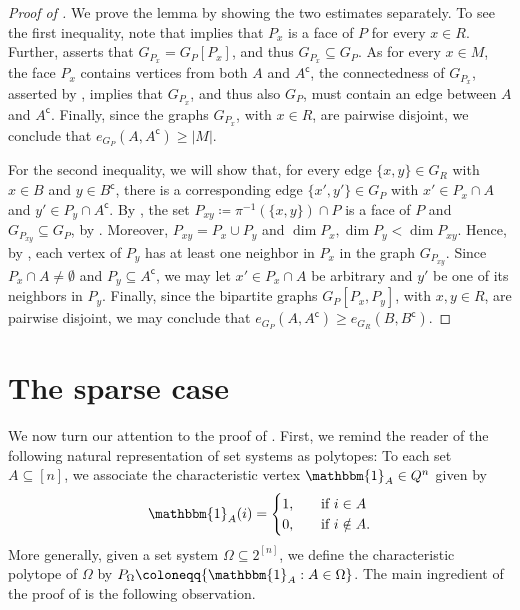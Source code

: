 \documentclass[11pt,a4paper,oneside,reqno]{amsart}
\def\1{\mathbbm{1}}
\begin{document}
\begin{proof}[Proof of ]
  We prove the lemma by showing the two estimates separately.
  To see the first inequality, note that  implies that $P_x$ is a face of $P$ for every $x\in R$.
  Further,  asserts that $G_{P_x} = G_P[P_x]$, and thus $G_{P_x} \subseteq G_P$.
  As for every $x\in M$, the face $P_x$ contains vertices from both $A$ and $A^{\mathsf{c}}$, the connectedness of $G_{P_x}$, asserted by , implies that $G_{P_x}$, and thus also $G_P$, must contain an edge between $A$ and $A^{\mathsf{c}}$.
  Finally, since the graphs $G_{P_x}$, with $x \in R$, are pairwise disjoint, we conclude that $e_{G_P}(A,A^{\mathsf{c}}) \geq |M|$.

  For the second inequality, we will show that, for every edge $\{x,y\} \in G_R$ with $x\in B$ and $y\in B^{\mathsf{c}}$, there is a corresponding edge $\{x', y'\} \in G_P$ with $x' \in P_x \cap A$ and $y' \in P_y \cap A^{\mathsf{c}}$.
  By , the set $P_{xy} \coloneqq \pi^{-1}(\{x,y\}) \cap P$ is a face of $P$ and $G_{P_{xy}} \subseteq G_P$, by .
  Moreover, $P_{xy} = P_x \cup P_y$ and $\dim{P_x}, \dim{P_y} < \dim{P_{xy}}$.
  Hence, by , each vertex of $P_y$ has at least one neighbor in $P_x$ in the graph $G_{P_{xy}}$.
  Since $P_x \cap A \neq \emptyset$ and $P_y \subseteq A^{\mathsf{c}}$, we may let $x' \in P_x \cap A$ be arbitrary and $y'$ be one of its neighbors in $P_y$.
  Finally, since the bipartite graphs $G_P[P_x, P_y]$, with $x, y \in R$, are pairwise disjoint, we may conclude that $e_{G_P}(A, A^{\mathsf{c}}) \ge e_{G_R}(B, B^{\mathsf{c}})$.
\end{proof}

\section{The sparse case}\label{sec:sparse}

We now turn our attention to the proof of . First, we remind the reader of the following natural representation of set systems as polytopes:  To each set $A \subseteq [n]$, we associate the characteristic vertex $\1_A \in Q^n$ given by
\[
  \1_A(i) =
  \begin{cases}
    1, &\quad \text{if $i\in A$}\\
    0, &\quad \text{if $i\notin A$}.
  \end{cases}
\]
More generally, given a set system $\Omega \subseteq 2^{[n]}$, we define the characteristic polytope of $\Omega$ by $P_{\Omega}\coloneqq\{\1_A: A\in \Omega\}$. The main ingredient of the proof of  is the following observation.
\end{document}

